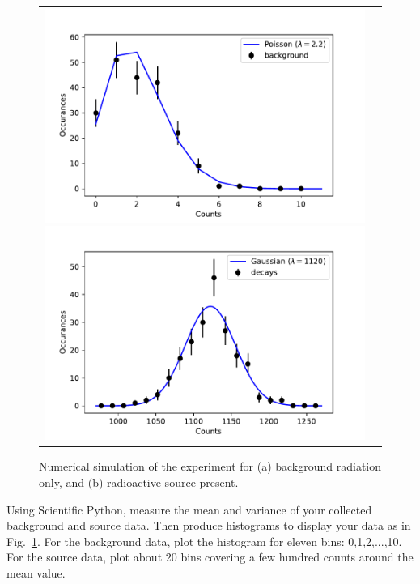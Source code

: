 \begin{figure}[htbp]
\begin{center}
\begin{tabular}{cc}
\includegraphics[height=0.22\textheight]{figs/labs/geiger/background.pdf}
\includegraphics[height=0.22\textheight]{figs/labs/geiger/source.pdf}
\end{tabular}
\end{center}
\caption{\label{fig:geigeranalysis} Numerical simulation of the experiment
  for (a) background radiation only, and (b) radioactive source
  present.}
\end{figure}

Using Scientific Python, measure the mean and variance of your
collected background and source data.  Then produce histograms to
display your data as in Fig.~\ref{fig:geigeranalysis}.  For the
background data, plot the histogram for eleven bins: 0,1,2,...,10.
For the source data, plot about 20 bins covering a few hundred counts
around the mean value.

